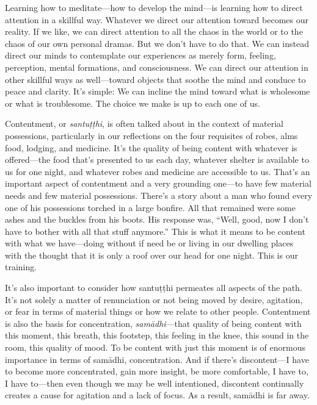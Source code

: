 
Learning how to meditate---how to develop the mind---is learning how to 
direct attention in a skillful way. Whatever we direct our attention 
toward becomes our reality. If we like, we can direct attention to all 
the chaos in the world or to the chaos of our own personal dramas. But 
we don't have to do that. We can instead direct our minds to 
contemplate our experiences as merely form, feeling, perception, mental 
formations, and consciousness. We can direct our attention in other 
skillful ways as well---toward objects that soothe the mind and conduce 
to peace and clarity. It's simple: We can incline the mind toward what 
is wholesome or what is troublesome. The choice we make is up to each 
one of us.


Contentment, or \emph{santuṭṭhi}, is often talked about in the 
context of material possessions, particularly in our reflections on the 
four requisites of robes, alms food, lodging, and medicine. It's the 
quality of being content with whatever is offered---the food that's 
presented to us each day, whatever shelter is available to us for one 
night, and whatever robes and medicine are accessible to us. That's an 
important aspect of contentment and a very grounding one---to have few 
material needs and few material possessions. There's a story about a 
man who found every one of his possessions torched in a large bonfire. 
All that remained were some ashes and the buckles from his boots. His 
response was, ``Well, good, now I don't have to bother with all that 
stuff anymore.'' This is what it means to be content with what we 
have---doing without if need be or living in our dwelling places with 
the thought that it is only a roof over our head for one night. This is 
our training.

It's also important to consider how santuṭṭhi permeates all aspects 
of the path. It's not solely a matter of renunciation or not being 
moved by desire, agitation, or fear in terms of material things or how 
we relate to other people. Contentment is also the basis for 
concentration, \emph{samādhi}---that quality of being content with 
this moment, this breath, this footstep, this feeling in the knee, this 
sound in the room, this quality of mood. To be content with just this 
moment is of enormous importance in terms of samādhi, concentration. 
And if there's discontent---I have to become more concentrated, gain 
more insight, be more comfortable, I have to, I have to---then even 
though we may be well intentioned, discontent continually creates a 
cause for agitation and a lack of focus. As a result, samādhi is far 
away.

